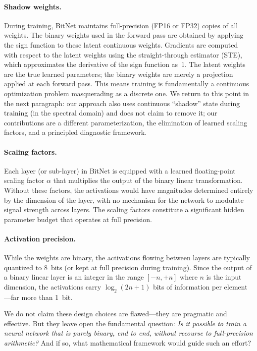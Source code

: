 \documentclass[12pt,a4paper]{article}
\theoremstyle{plain}
\theoremstyle{definition}
\theoremstyle{remark}
\begin{document}
\paragraph{Shadow weights.}
During training, BitNet maintains full-precision (FP16 or FP32) copies of all weights. The binary weights used in the forward pass are obtained by applying the sign function to these latent continuous weights. Gradients are computed with respect to the latent weights using the straight-through estimator (STE), which approximates the derivative of the sign function as~1. The latent weights are the true learned parameters; the binary weights are merely a projection applied at each forward pass. This means training is fundamentally a continuous optimization problem masquerading as a discrete one.
We return to this point in the next paragraph: our approach also uses continuous ``shadow'' state during training (in the spectral domain) and does not claim to remove it; our contributions are a different parameterization, the elimination of learned scaling factors, and a principled diagnostic framework.

\paragraph{Scaling factors.}
Each layer (or sub-layer) in BitNet is equipped with a learned floating-point scaling factor $\alpha$ that multiplies the output of the binary linear transformation. Without these factors, the activations would have magnitudes determined entirely by the dimension of the layer, with no mechanism for the network to modulate signal strength across layers. The scaling factors constitute a significant hidden parameter budget that operates at full precision.

\paragraph{Activation precision.}
While the weights are binary, the activations flowing between layers are typically quantized to 8~bits (or kept at full precision during training). Since the output of a binary linear layer is an integer in the range $[-n, +n]$ where $n$ is the input dimension, the activations carry $\log_2(2n+1)$ bits of information per element---far more than 1~bit.

We do not claim these design choices are flawed---they are pragmatic and effective. But they leave open the fundamental question: \emph{Is it possible to train a neural network that is purely binary, end to end, without recourse to full-precision arithmetic?} And if so, what mathematical framework would guide such an effort?
\end{document}
